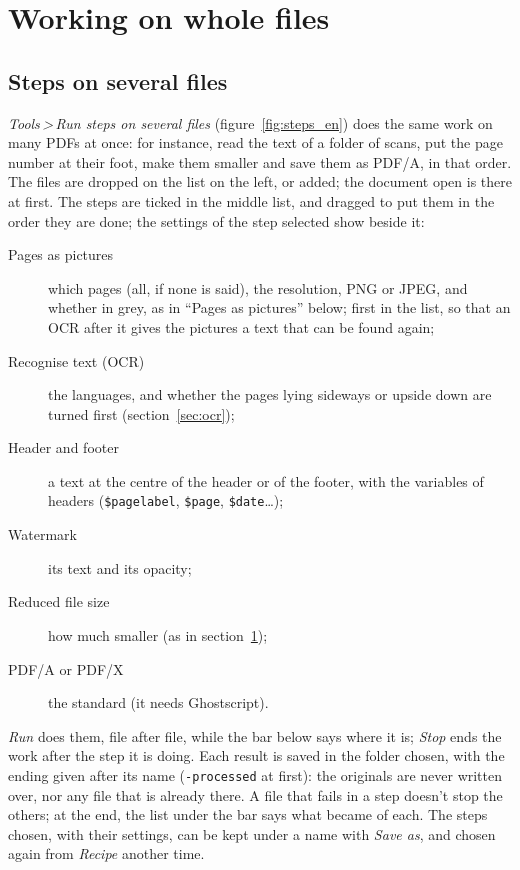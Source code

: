 \documentclass[12pt,
              article,
              oneside
              ]{memoir}
\newcommand*{\menu}[1]{\textit{#1}}
\newcommand*{\then}{\,>\,}
\begin{document}
\section{Working on whole files}
\label{sec:files}

\subsection{Steps on several files}

%
\menu{Tools\then Run steps on several files} (figure~\ref{fig:steps_en}) does
the same work on many PDFs at once: for instance, read the text of a folder
of scans, put the page number at their foot, make them smaller and save
them as PDF/A, in that order. The files are dropped on the list on the left,
or added; the document open is there at first. The steps are ticked in the
middle list, and dragged to put them in the order they are done; the
settings of the step selected show beside it:

\begin{description}
\item[Pages as pictures] which pages (all, if none is said), the
  resolution, PNG or JPEG, and whether in grey, as in \enquote{Pages as
  pictures} below; first in the list, so that an OCR after it gives the
  pictures a text that can be found again;
\item[Recognise text (OCR)] the languages, and whether the pages lying
  sideways or upside down are turned first (section~\ref{sec:ocr});
\item[Header and footer] a text at the centre of the header or of the
  footer, with the variables of headers (\texttt{\$pagelabel},
  \texttt{\$page}, \texttt{\$date}\ldots);
\item[Watermark] its text and its opacity;
\item[Reduced file size] how much smaller (as in
  section~\ref{sec:files});
\item[PDF/A or PDF/X] the standard (it needs Ghostscript).
\end{description}

\noindent \menu{Run} does them, file after file, while the bar below says
where it is; \menu{Stop} ends the work after the step it is doing. Each
result is saved in the folder chosen, with the ending given after its name
(\texttt{-processed} at first): the originals are never written over, nor
any file that is already there. A file that fails in a step doesn't stop
the others; at the end, the list under the bar says what became of each.
The steps chosen, with their settings, can be kept under a name with
\menu{Save as}, and chosen again from \menu{Recipe} another time.
\end{document}
